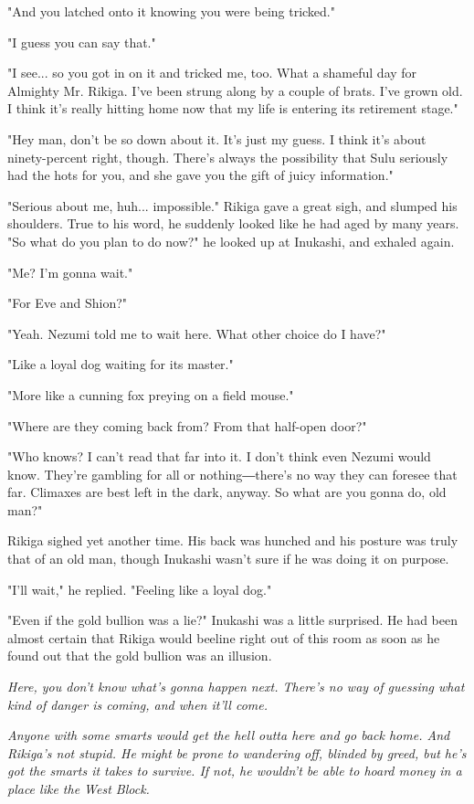 "And you latched onto it knowing you were being tricked."

"I guess you can say that."

"I see... so you got in on it and tricked me, too. What a shameful day
for Almighty Mr. Rikiga. I've been strung along by a couple of brats.
I've grown old. I think it's really hitting home now that my life is
entering its retirement stage."

"Hey man, don't be so down about it. It's just my guess. I think it's
about ninety-percent right, though. There's always the possibility that
Sulu seriously had the hots for you, and she gave you the gift of juicy
information."

"Serious about me, huh... impossible." Rikiga gave a great sigh, and
slumped his shoulders. True to his word, he suddenly looked like he had
aged by many years. "So what do you plan to do now?" he looked up at
Inukashi, and exhaled again.

"Me? I'm gonna wait."

"For Eve and Shion?"

"Yeah. Nezumi told me to wait here. What other choice do I have?"

"Like a loyal dog waiting for its master."

"More like a cunning fox preying on a field mouse."

"Where are they coming back from? From that half-open door?"

"Who knows? I can't read that far into it. I don't think even Nezumi
would know. They're gambling for all or nothing―there's no way they can
foresee that far. Climaxes are best left in the dark, anyway. So what
are you gonna do, old man?"

Rikiga sighed yet another time. His back was hunched and his posture was
truly that of an old man, though Inukashi wasn't sure if he was doing it
on purpose.

"I'll wait," he replied. "Feeling like a loyal dog."

"Even if the gold bullion was a lie?" Inukashi was a little surprised.
He had been almost certain that Rikiga would beeline right out of this
room as soon as he found out that the gold bullion was an illusion.

\emph{Here, you don't know what's gonna happen next. There's no way of
guessing what kind of danger is coming, and when it'll come.}

\emph{Anyone with some smarts would get the hell outta here and go back home.
And Rikiga's not stupid. He might be prone to wandering off, blinded by
greed, but he's got the smarts it takes to survive. If not, he wouldn't
be able to hoard money in a place like the West Block.}

